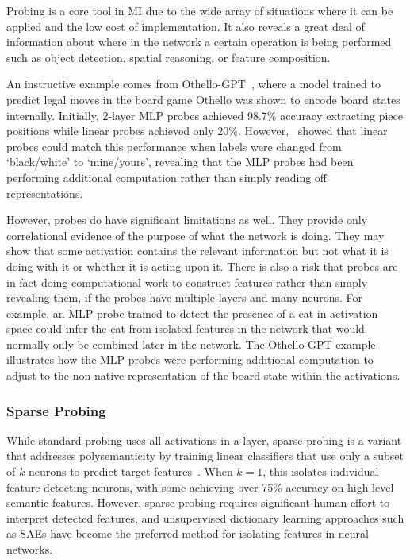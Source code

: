 Probing is a core tool in MI due to the wide array of situations where it can be applied and the low cost of implementation. It also reveals a great deal of information about where in the network a certain operation is being performed such as object detection, spatial reasoning, or feature composition. 

An instructive example comes from Othello-GPT~\citep{li_2024_emergent}, where a model trained to predict legal moves in the board game Othello was shown to encode board states internally. Initially, 2-layer MLP probes achieved 98.7\% accuracy extracting piece positions while linear probes achieved only 20\%. However,~\citet{nanda_2023_emergent} showed that linear probes could match this performance when labels were changed from `black/white' to `mine/yours', revealing that the MLP probes had been performing additional computation rather than simply reading off representations.

However, probes do have significant limitations as well. They provide only correlational evidence of the purpose of what the network is doing. They may show that some activation contains the relevant information but not what it is doing with it or whether it is acting upon it. There is also a risk that probes are in fact doing computational work to construct features rather than simply revealing them, if the probes have multiple layers and many neurons. For example, an MLP probe trained to detect the presence of a cat in activation space could infer the cat from isolated features in the network that would normally only be combined later in the network. The Othello-GPT example illustrates how the MLP probes were performing additional computation to adjust to the non-native representation of the board state within the activations.


\subsubsection{Sparse Probing}

While standard probing uses all activations in a layer, sparse probing is a variant that addresses polysemanticity by training linear classifiers that use only a subset of $k$ neurons to predict target features~\citep{gurnee_2023_finding}. When $k=1$, this isolates individual feature-detecting neurons, with some achieving over 75\% accuracy on high-level semantic features. However, sparse probing requires significant human effort to interpret detected features, and unsupervised dictionary learning approaches such as SAEs have become the preferred method for isolating features in neural networks.

